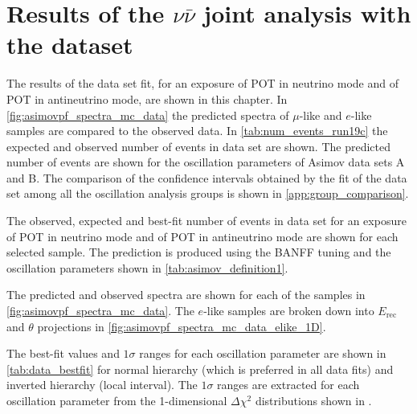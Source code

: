 \section {Results of the $\nu\bar{\nu}$ joint analysis with the \RunPeriod dataset}
\label{sec:results}

The results of the \RunPeriod data set fit, for an exposure of \TotalPotNu POT in neutrino mode and of \TotalPotNuBar POT in antineutrino mode, are shown in this chapter. In \cref{fig:asimovpf_spectra_mc_data} the predicted spectra of $\mu$-like and $e$-like samples are compared to the observed data. In \cref{tab:num_events_run19c} the expected and observed number of events in \RunPeriod data set are shown. The predicted number of events are shown for the oscillation parameters of Asimov data sets A and B. The comparison of the confidence intervals obtained by the fit of the \RunPeriod data set among all the oscillation analysis groups is shown in \cref{app:group_comparison}.

\begin{table}[htb]
\centering
\begin{adjustbox}{width=\textwidth, totalheight=\textheight, keepaspectratio}

\end{adjustbox}
\caption{
The observed, expected and best-fit number of events in \RunPeriod data set for an exposure of \TotalPotNuRunOneEight POT in neutrino mode and of \TotalPotNuBarRunOneEight POT in antineutrino mode are shown 
for each selected sample. The prediction is produced using the BANFF tuning and the oscillation parameters shown in \cref{tab:asimov_definition1}.
}
\label{tab:num_events_run19c}
\end{table}

The predicted and observed spectra are shown for each of the samples in \cref{fig:asimovpf_spectra_mc_data}. The $e$-like samples are broken down into $E_\text{rec}$ and $\theta$ projections in \cref{fig:asimovpf_spectra_mc_data_elike_1D}.



The best-fit values and $1\sigma$ ranges for each oscillation parameter are shown in \cref{tab:data_bestfit} for normal hierarchy (which is preferred in all data fits) and inverted hierarchy (local interval). The $1\sigma$ ranges are extracted for each oscillation parameter from the 1-dimensional $\Delta \chi^2$ distributions shown in .

